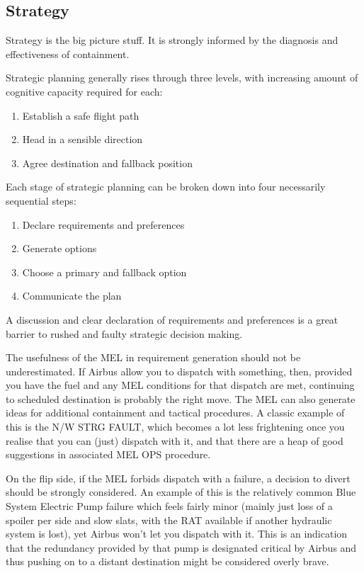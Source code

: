 \documentclass[a5paper,11pt,titlepage]{article}
\begin{document}
\subsection{Strategy}

Strategy is the big picture stuff. It is strongly informed by the
diagnosis and effectiveness of containment.

Strategic planning generally rises through three levels, with increasing
amount of cognitive capacity required for each:

\begin{enumerate}
\item Establish a safe flight path
\item Head in a sensible direction
\item Agree destination and fallback position
\end{enumerate}

Each stage of strategic planning can be broken down into four
necessarily sequential steps:

\begin{enumerate}
\item Declare requirements and preferences
\item Generate options
\item Choose a primary and fallback option
\item Communicate the plan
\end{enumerate}

A discussion and clear declaration of requirements and preferences is a
great barrier to rushed and faulty strategic decision making.

The usefulness of the MEL in requirement generation should not be
underestimated. If Airbus allow you to dispatch with something, then,
provided you have the fuel and any MEL conditions for that dispatch are
met, continuing to scheduled destination is probably the right move. The
MEL can also generate ideas for additional containment and tactical
procedures. A classic example of this is the N/W STRG FAULT, which
becomes a lot less frightening once you realise that you can (just)
dispatch with it, and that there are a heap of good suggestions in
associated MEL OPS procedure.

On the flip side, if the MEL forbids dispatch with a failure, a decision
to divert should be strongly considered. An example of this is the
relatively common Blue System Electric Pump failure which feels fairly
minor (mainly just loss of a spoiler per side and slow slats, with the
RAT available if another hydraulic system is lost), yet Airbus won't let
you dispatch with it. This is an indication that the redundancy provided
by that pump is designated critical by Airbus and thus pushing on to
a distant destination might be considered overly brave.
\end{document}
